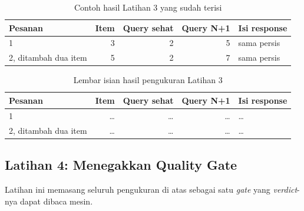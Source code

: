 \begin{table}[!htb]
  \centering
  \caption{Contoh hasil Latihan 3 yang sudah terisi}
  \label{tab:c6-lat3-contoh}
  \begin{tabularx}{\textwidth}{lrrrX}
    \hline
    \textbf{Pesanan} & \textbf{Item} & \textbf{Query sehat} & \textbf{Query N+1} & \textbf{Isi response} \\
    \hline
    1 & 3 & 2 & 5 & sama persis \\
    \hline
    2, ditambah dua item & 5 & 2 & 7 & sama persis \\
    \hline
  \end{tabularx}
\end{table}

\begin{table}[!htb]
  \centering
  \caption{Lembar isian hasil pengukuran Latihan 3}
  \label{tab:c6-lat3-hasil}
  \begin{tabularx}{\textwidth}{lrrrX}
    \hline
    \textbf{Pesanan} & \textbf{Item} & \textbf{Query sehat} & \textbf{Query N+1} & \textbf{Isi response} \\
    \hline
    1 & \dots & \dots & \dots & \dots \\
    \hline
    2, ditambah dua item & \dots & \dots & \dots & \dots \\
    \hline
  \end{tabularx}
\end{table}

\subsection*{Latihan 4: Menegakkan Quality Gate}

Latihan ini memasang seluruh pengukuran di atas sebagai satu \textit{gate} yang
\textit{verdict}-nya dapat dibaca mesin.

